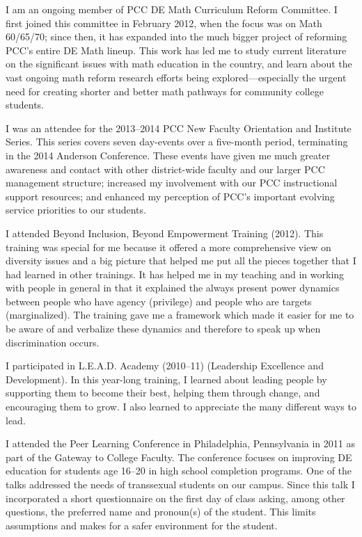 \begin{description}[style=nextline]
\item[Thomas Songer (Temporary Job-share Instructor, Sylvania Campus)]
	I am an ongoing member of PCC DE Math Curriculum Reform Committee.  I first
	joined this committee in February 2012, when the focus was on Math 60/65/70;
	since then, it has expanded into the much bigger project of reforming PCC's
	entire DE Math lineup.  This work has led me to study current literature on the
	significant issues with math education in the country, and learn about the vast
	ongoing math reform research efforts being explored---especially the urgent
	need for creating shorter and better math pathways for community college
	students.

	I was an attendee for the 2013--2014 PCC New Faculty Orientation and Institute
	Series.  This series covers seven day-events over a five-month period,
	terminating in the 2014 Anderson Conference.  These events have given me much
	greater awareness and contact with other district-wide faculty and our larger
	PCC management structure; increased my involvement with our PCC instructional
	support resources; and enhanced my perception of PCC's important evolving
	service priorities to our students.

	\item[Heiko Spoddeck (Full-time Instructor, Math Coordinator, Sylvania Campus)]
	I attended Beyond Inclusion, Beyond Empowerment Training (2012).  This training
	was special for me because it offered a more comprehensive view on diversity
	issues and a big picture that helped me put all the pieces together that I had
	learned in other trainings. It has helped me in my teaching and in working with
	people in general in that it explained the always present power dynamics
	between people who have agency (privilege) and people who are targets
	(marginalized). The training gave me a framework which made it easier for me to
	be aware of and verbalize these dynamics and therefore to speak up when
	discrimination occurs.

	I participated in L.E.A.D. Academy (2010--11) (Leadership Excellence and
	Development).  In this year-long training, I learned about leading people by
	supporting them to become their best, helping them through change, and
	encouraging them to grow. I also learned to appreciate the many different ways
	to lead.

\item[Greta Swanson (Temporary Full-time Instructor, Sylvania Campus)]
	I attended the Peer Learning Conference in Philadelphia, Pennsylvania in 2011
	as part of the Gateway to College Faculty. The conference focuses on improving
	DE education for students age 16--20 in high school completion programs.
	One of the talks addressed the needs of transsexual students on our campus.
	Since this talk I incorporated a short questionnaire on the first day of class
	asking, among other questions, the preferred name and pronoun(s) of the
	student. This limits assumptions and makes for a safer environment for the
	student.


\end{description}
